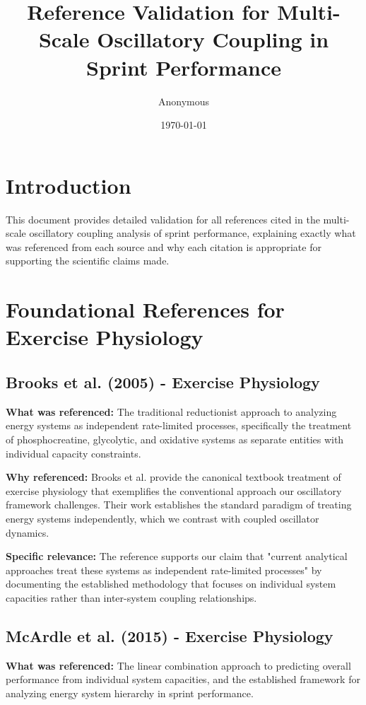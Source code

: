 \documentclass{article}
\title{Reference Validation for Multi-Scale Oscillatory Coupling in Sprint Performance}
\author{Anonymous}
\date{\today}
\begin{document}
\maketitle

\section{Introduction}

This document provides detailed validation for all references cited in the multi-scale oscillatory coupling analysis of sprint performance, explaining exactly what was referenced from each source and why each citation is appropriate for supporting the scientific claims made.

\section{Foundational References for Exercise Physiology}

\subsection{Brooks et al. (2005) - Exercise Physiology}

\textbf{What was referenced:} The traditional reductionist approach to analyzing energy systems as independent rate-limited processes, specifically the treatment of phosphocreatine, glycolytic, and oxidative systems as separate entities with individual capacity constraints.

\textbf{Why referenced:} Brooks et al. provide the canonical textbook treatment of exercise physiology that exemplifies the conventional approach our oscillatory framework challenges. Their work establishes the standard paradigm of treating energy systems independently, which we contrast with coupled oscillator dynamics.

\textbf{Specific relevance:} The reference supports our claim that "current analytical approaches treat these systems as independent rate-limited processes" by documenting the established methodology that focuses on individual system capacities rather than inter-system coupling relationships.

\subsection{McArdle et al. (2015) - Exercise Physiology}

\textbf{What was referenced:} The linear combination approach to predicting overall performance from individual system capacities, and the established framework for analyzing energy system hierarchy in sprint performance.
\end{document}
